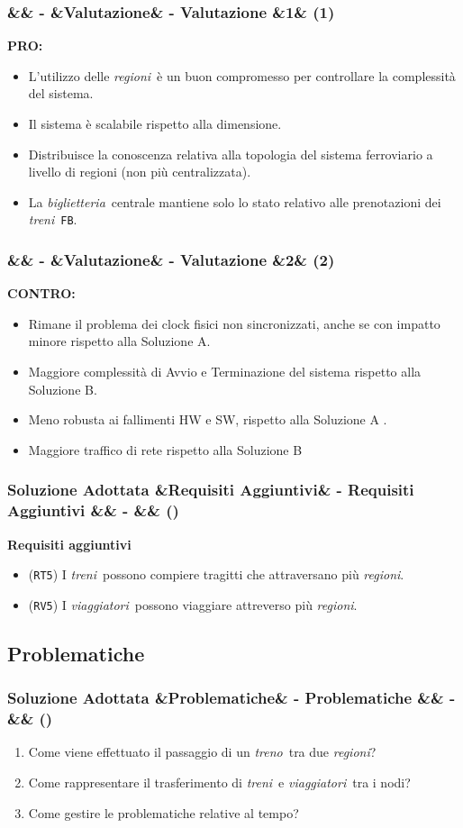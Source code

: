 \documentclass[slidestop,compress,blackandwhite]{beamer}
\newcommand{\ttt}[1]{\texttt{#1}}
\newcommand{\ii}[1]{\textit{#1}}
\newcommand{\treno}{\ii{treno}}
\newcommand{\treni}{\ii{treni}}
\newcommand{\viaggiatori}{\ii{viaggiatori}}
\newcommand{\biglietteria}{\ii{biglietteria}}
\newcommand{\regioni}{\ii{regioni}}
\newcommand{\PRO}{\textbf{PRO:}}
\newcommand{\CONTRO}{\textbf{CONTRO:}}
\newcommand{\cm}[1]{\vspace{#1cm}}
\newcommand{\newtitle}[4]{
	#1 
	\ifx&#2&%
	\else
  		\large- #2
	\fi
	\ifx&#3&%
	\else
  		\normalsize- #3
	\fi
	\ifx&#4&%
	\else
  		\normalsize (#4)
	\fi
}
\newcommand{\newframe}[5]{
	\begin{frame}
		\frametitle{\newtitle{#1}{#2}{#3}{#4}}
		#5
	\end{frame}
}
\newcommand{\itemt}[1]{\item (\ttt{#1})}
\begin{document}
	\newframe{}{}{Valutazione}{1}{
		\vspace{0.5cm}
		\PRO
		\begin{itemize}
			\item L'utilizzo delle \regioni~è un buon compromesso per controllare la complessità del sistema.
			\item Il sistema è scalabile rispetto alla dimensione.
			\item Distribuisce la conoscenza relativa alla topologia del sistema ferroviario a livello di regioni (non più centralizzata).
			\item La \biglietteria~centrale mantiene solo lo stato relativo alle prenotazioni dei \treni~\ttt{FB}.
		\end{itemize}
	
	}
	
	\newframe{}{}{Valutazione}{2}{
		\vspace{0.5cm}
		\CONTRO
		\begin{itemize}
			\item Rimane il problema dei clock fisici non sincronizzati, anche se con impatto minore rispetto alla Soluzione A.
			\item Maggiore complessità di Avvio e Terminazione del sistema rispetto alla Soluzione B.
			\item Meno robusta ai fallimenti HW e SW, rispetto alla Soluzione A .
			\item Maggiore traffico di rete rispetto alla Soluzione B
		\end{itemize}
	}
	
	\newframe{Soluzione Adottata}{Requisiti Aggiuntivi}{}{}{
		\cm{0.5}
		\textbf{Requisiti aggiuntivi}
		\cm{0.5}
		\begin{itemize}
			\itemt{RT5} I \treni~possono compiere tragitti che attraversano più \regioni.
			\cm{0.5}	
			\itemt{RV5} I \viaggiatori~possono viaggiare attreverso più \regioni.
		\end{itemize}
	}
	
	\subsection{Problematiche}
	\newframe{Soluzione Adottata}{Problematiche}{}{}{
		\vspace{0.5cm}
		\begin{enumerate}
			\item Come viene effettuato il passaggio di un \treno~tra due \regioni? 
			\vspace{0.4cm}
			\item Come rappresentare il trasferimento di \treni~e \viaggiatori~tra i nodi? 
			\vspace{0.4cm}
			\item Come gestire le problematiche relative al tempo?
		\end{enumerate}
	}
	
\end{document}
